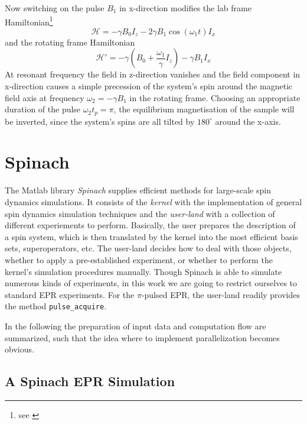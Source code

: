 \documentclass[11.5pt,a4paper]{article}
\begin{document}
Now switching on the pulse $B_1$ in x-direction modifies the lab frame Hamiltonian\footnote{see \cite[Chap. 4.2.2 The resonant radiofrequency field, p.111f]{nmr-ox}}
\begin{equation}
 \mathcal{H} = - \gamma B_0 I_z - 2 \gamma B_1 \cos(\omega_1 t) I_x
\end{equation}
and the rotating frame Hamiltonian
\begin{equation}
  \mathcal{H}' = - \gamma ( B_0 + \frac{\omega_1}{\gamma}I_z) - \gamma B_1 I_x
\end{equation}
At resonant frequency the field in z-direction vanishes and the field component in x-direction causes a simple precession of the system's spin around the magnetic field axis at frequency $\omega_2 = - \gamma B_1$ in the rotating frame. Choosing an appropriate duration of the pulse $\omega_2 t_p = \pi$, the equilibrium magnetisation of the sample will be inverted, since the system's spins are all tilted by $180^\circ$ around the x-axis. 



\section{Spinach}
The Matlab library \emph{Spinach} supplies efficient methods for large-scale spin dynamics simulations. It consists of the \emph{kernel} with the implementation of general spin dynamics simulation techniques and the \emph{user-land} with a collection of different experiements to perform. Basically, the user prepares the description of a spin system, which is then translated by the kernel into the most efficient basis sets, superoperators, etc. The user-land decides how to deal with those objects, whether to apply a pre-established experiment, or whether to perform the kernel's simulation procedures manually. Though Spinach is able to simulate numerous kinds of experiments, in this work we are going to restrict ourselves to standard EPR experiments. For the $\pi$-pulsed EPR, the user-land readily provides the method \verb|pulse_acquire|. 

In the following the preparation of input data and computation flow are summarized, such that the idea where to implement parallelization becomes obvious.

\subsection{A Spinach EPR Simulation}
\end{document}
